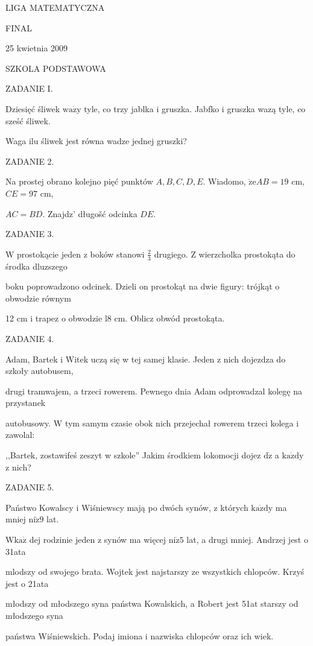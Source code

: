 \documentclass[a4paper,12pt]{article}
\begin{document}
LIGA MATEMATYCZNA

FINAL

25 kwietnia 2009

SZKOLA PODSTAWOWA

ZADANIE I.

Dziesięć śliwek $\mathrm{w}\mathrm{a}\dot{\mathrm{z}}\mathrm{y}$ tyle, co trzy jablka i gruszka. Jabfko i gruszka wazą tyle, co sześć śliwek.

Waga ilu śliwek jest równa wadze jednej gruszki?

ZADANIE 2.

Na prostej obrano kolejno pięć punktów $A, B, C, D, E$. Wiadomo, $\dot{\mathrm{z}}\mathrm{e}AB=19$ cm, $CE=97$ cm,

$AC=BD$. Znajdz' długošć odcinka $DE.$

ZADANIE 3.

$\mathrm{W}$ prostokącie jeden z boków stanowi $\displaystyle \frac{2}{3}$ drugiego. $\mathrm{Z}$ wierzcholka prostokąta do środka dluzszego

boku poprowadzono odcinek. Dzieli on prostokąt na dwie figury: trójkąt o obwodzie równym

12 cm i trapez o obwodzie l8 cm. Oblicz obwód prostokąta.

ZADANIE 4.

Adam, Bartek i Witek uczą się w tej samej klasie. Jeden z nich dojezdza do szkoły autobusem,

drugi tramwajem, a trzeci rowerem. Pewnego dnia Adam odprowadzal kolegę na przystanek

autobusowy. $\mathrm{W}$ tym samym czasie obok nich przejechał rowerem trzeci kolega i zawolal:

,,Bartek, zostawifeś zeszyt w szkole'' Jakim środkiem lokomocji dojez $\mathrm{d}\dot{\mathrm{z}}$ a $\mathrm{k}\mathrm{a}\dot{\mathrm{z}}\mathrm{d}\mathrm{y}$ z nich?

ZADANIE 5.

Państwo Kowalscy i Wiśniewscy mają po dwóch synów, z których $\mathrm{k}\mathrm{a}\dot{\mathrm{z}}\mathrm{d}\mathrm{y}$ ma mniej $\mathrm{n}\mathrm{i}\dot{\mathrm{z}}9$ lat.

$\mathrm{W}\mathrm{k}\mathrm{a}\dot{\mathrm{z}}$ dej rodzinie jeden z synów ma więcej $\mathrm{n}\mathrm{i}\dot{\mathrm{z}} 5$ lat, a drugi mniej. Andrzej jest o 31ata

mlodszy od swojego brata. Wojtek jest najstarszy ze wszystkich chlopców. Krzyś jest o 21ata

młodszy od młodszego syna państwa Kowalskich, a Robert jest 51at starszy od młodszego syna

państwa Wiśniewskich. Podaj imiona i nazwiska chlopców oraz ich wiek.
\end{document}
